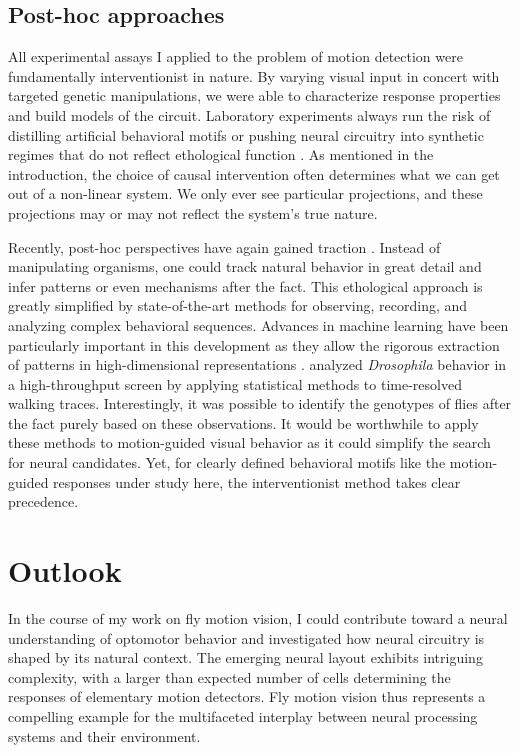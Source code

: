 \subsection{Post-hoc approaches}
All experimental assays I applied to the problem of motion detection were fundamentally interventionist in nature. By varying visual input in concert with targeted genetic manipulations, we were able to characterize response properties and build models of the circuit. Laboratory experiments always run the risk of distilling artificial behavioral motifs or pushing neural circuitry into synthetic regimes that do not reflect ethological function \citep{Krakauer:2017aa}. As mentioned in the introduction, the choice of causal intervention often determines what we can get out of a non-linear system. We only ever see particular projections, and these projections may or may not reflect the system's true nature.

Recently, post-hoc perspectives have again gained traction \citep{GomezMarin:2014aa}. Instead of manipulating organisms, one could track natural behavior in great detail and infer patterns or even mechanisms after the fact. This ethological approach is greatly simplified by state-of-the-art methods for observing, recording, and analyzing complex behavioral sequences. Advances in machine learning have been particularly important in this development as they allow the rigorous extraction of patterns in high-dimensional representations \citep[for instance, see][]{Kabra:2013aa}. \citet{Branson:2009aa} analyzed \textit{Drosophila} behavior in a high-throughput screen by applying statistical methods to time-resolved walking traces. Interestingly, it was possible to identify the genotypes of flies after the fact purely based on these observations. It would be worthwhile to apply these methods to motion-guided visual behavior as it could simplify the search for neural candidates. Yet, for clearly defined behavioral motifs like the motion-guided responses under study here, the interventionist method takes clear precedence.

\section{Outlook}
In the course of my work on fly motion vision, I could contribute toward a neural understanding of optomotor behavior and investigated how neural circuitry is shaped by its natural context. The emerging neural layout exhibits intriguing complexity, with a larger than expected number of cells determining the responses of elementary motion detectors. Fly motion vision thus represents a compelling example for the multifaceted interplay between neural processing systems and their environment.

